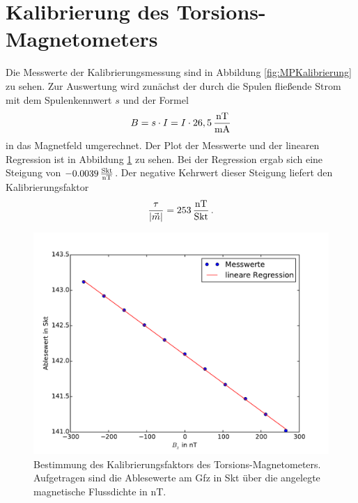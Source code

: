 \section{Kalibrierung des Torsions-Magnetometers}

Die Messwerte der Kalibrierungsmessung sind in Abbildung \ref{fig:MPKalibrierung} zu sehen. Zur Auswertung wird zunächst der durch die Spulen fließende Strom mit dem Spulenkennwert $s$ und der Formel
\begin{equation}
 B=s\cdot I=I\cdot 26,5\,\frac{\mathrm{nT}}{\mathrm{mA}} 
\end{equation}
in das Magnetfeld umgerechnet. Der Plot der Messwerte und der linearen Regression ist in Abbildung \ref{fig:kalibrierung} zu sehen. Bei der Regression ergab sich eine Steigung von $-0.0039\,\frac{\mathrm{Skt}}{\mathrm{nT}}$. Der negative Kehrwert dieser Steigung liefert den Kalibrierungsfaktor
\begin{equation}
 \frac{\tau}{|\vec{m}|}=253\,\frac{\mathrm{nT}}{\mathrm{Skt}} \text{\,.}
\end{equation}

\begin{figure}
 \centering
 \includegraphics[width=\textwidth]{fig/kalibrierung.pdf}
 \caption[Bestimmung des Kalibrierungsfaktors des Torsions-Magnetometers]{Bestimmung des Kalibrierungsfaktors des Torsions-Magnetometers. Aufgetragen sind die Ablesewerte am Gfz in Skt über die angelegte magnetische Flussdichte in nT.}
 \label{fig:kalibrierung}
\end{figure}


